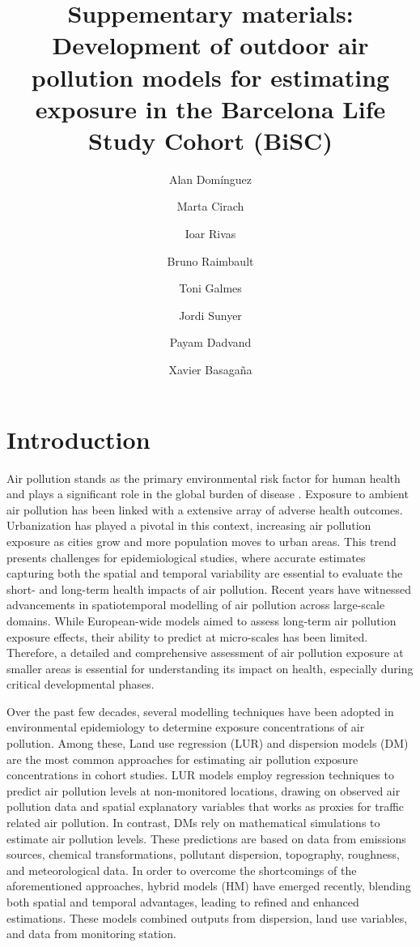 \documentclass{article}
\title{Suppementary materials: Development of outdoor air pollution models for estimating exposure in the Barcelona Life Study Cohort (BiSC)}
\author[1, 2]{Alan Domínguez}
\author[1]{Marta Cirach}
\author[1,3]{Ioar Rivas}
\author[1]{Bruno Raimbault}
\author[1]{Toni Galmes}
\author[1,2,3]{Jordi Sunyer}
\author[1, 3, 4]{Payam Dadvand}
\author[1,2,3]{Xavier Basagaña}
\affil[1]{Barcelona Institute for Global Health (ISGlobal), Barcelona, Spain.}
\affil[2]{Universitat Popmpeu Fabra (UPF), Barcelona, Spain.}
\affil[3]{CIBER Epidemiología y Salud Pública (CIBERESP), Madrid, Spain.}
\affil[4]{London School of Hygiene and Tropical Medicine ( LSHTM), London, UK.}
\begin{document}
\maketitle

\section{Introduction}

Air pollution stands as the primary environmental risk factor for human health \cite{} and plays a significant role in the global burden of disease \cite{}. Exposure to ambient air pollution has been linked with a extensive array of adverse health outcomes\cite{}. Urbanization has played a pivotal in this context, increasing air pollution exposure as cities grow and more population moves to urban areas\cite{}. This trend presents challenges for epidemiological studies, where accurate estimates capturing both the spatial and temporal variability are essential to evaluate the short- and long-term health impacts of air pollution\cite{}. Recent years have witnessed advancements in spatiotemporal modelling of air pollution across large-scale domains. While European-wide models 
aimed to assess long-term air pollution exposure effects, their ability to predict at micro-scales has been limited\cite{}. Therefore, a detailed and comprehensive assessment of air pollution exposure at smaller areas is essential for understanding its impact on health, especially during critical developmental phases\cite{}.

Over the past few decades, several modelling techniques have been adopted in environmental epidemiology to determine exposure concentrations of air pollution\cite{}. Among these, Land use regression (LUR) and dispersion models (DM) are the most common approaches for estimating air pollution exposure concentrations in cohort studies. LUR models employ regression techniques to predict air pollution levels at non-monitored locations, drawing on observed air pollution data and spatial explanatory variables that works as proxies for traffic related air pollution\cite{}. In contrast, DMs rely on mathematical simulations to estimate air pollution levels. These predictions are based on data from emissions sources, chemical transformations, pollutant dispersion, topography, roughness, and meteorological data\cite{}. In order to overcome the shortcomings of the aforementioned approaches, hybrid models (HM) have emerged recently, blending both spatial and temporal advantages, leading to refined and enhanced estimations\cite{}. These models combined outputs from dispersion, land use variables, and  data from monitoring station\cite{}.
\end{document}
